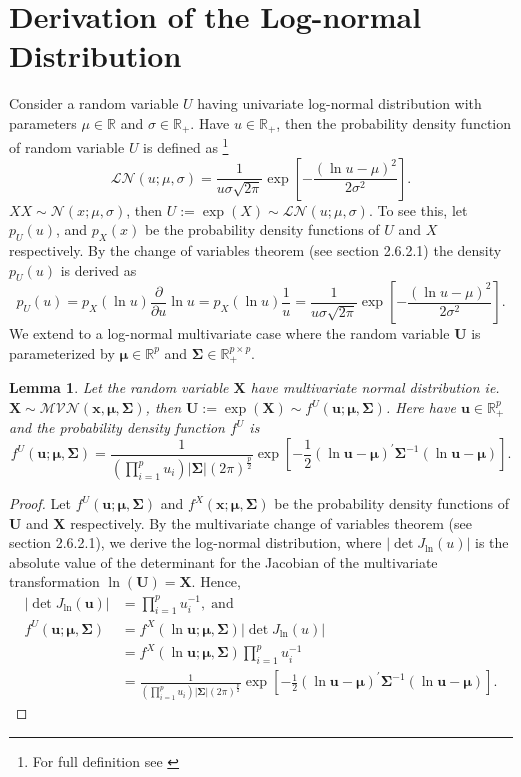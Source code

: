 \documentclass[11pt,letterpaper]{article}
\numberwithin{equation}{section}
\numberwithin{equation}{section}
\numberwithin{equation}{section}
\newtheorem{lemma}[theorem]{Lemma}
\begin{document}
\section{Derivation of the Log-normal Distribution }
Consider a random variable $U$ having univariate log-normal distribution with parameters $\mu \in \mathbb{R}$ and $\sigma \in \mathbb{R}_+ $. Have $u \in \mathbb{R}_+$, then the probability density function of random variable $U$ is defined as \footnote{For full definition see \cite{johnson1995continuous}}
$$\mathcal{LN}(u; \mu, \sigma) = \frac{1}{u\sigma\sqrt{2\pi}}\exp\left[-\frac{(\ln u - \mu)^2}{2\sigma^2}	\right].$$
$X$$ X \sim \mathcal{N}(x; \mu, \sigma) $, then $U := \exp{(X)}\sim \mathcal{LN}(u; \mu, \sigma) $.
To see this, let $p_U(u)$, and $ p_X(x) $ be the probability density functions of $U$ and $X$ respectively. By the change of variables theorem (see \cite{murphy2012machine} section 2.6.2.1) the density $p_U(u)$ is derived as
$$p_U(u) = p_X(\ln u )\frac{\partial}{\partial u} \ln u  =  p_X(\ln u ) \frac{1}{u} =  \frac{1}{u\sigma\sqrt{2\pi}}\exp\left[-\frac{(\ln u - \mu)^2}{2\sigma^2}	\right].$$\newline
 We extend to a log-normal multivariate case where the random variable $\bm{U} $ is parameterized by $ \bm{\mu} \in \mathbb{R}^p$ and $\bm{\Sigma} \in  \mathbb{R}_{+}^{p \times p} \label{changeVarUni} $.
\begin{lemma}
Let the random variable $\bm{X}$ have multivariate normal distribution ie. $\bm{X} \sim \mathcal{MVN}(\bm{x}, \bm{\mu},\bm{\Sigma}) $, then $\bm{U} := \exp(\bm{X} ) \sim  f^U(\bm{u}; \bm{\mu } , \bm{\Sigma} )$. Here
have $\bm{u} \in \mathbb{R}_{+}^p $ and the probability density function $f^U$ is
$$ f^U(\bm{u}; \bm{\mu } , \bm{\Sigma} )= \frac{1}{(\prod_{i=1}^{p}u_{i})| \bm{\Sigma} |(2 \pi)^{\frac{p}{2}}}   \exp\left[-\frac{1}{2}(\ln \bm{u} -\bm{\mu})^{'}  \bm{\Sigma}^{-1}(\ln \bm{u} -\bm{\mu})\right].  $$
\end{lemma}
\begin{proof}
Let $f^U(\bm{u}; \bm{\mu},\bm{\Sigma})$ and $f^X(\bm{x}; \bm{\mu},\bm{\Sigma})$ be the probability density functions of $\bm{U}$ and $\bm{X}$ respectively. By the multivariate change of variables theorem (see \cite{murphy2012machine} section 2.6.2.1), we derive the log-normal distribution, where $ | \det J_{\ln} (u) | $ is the absolute value of the determinant for the Jacobian of the multivariate transformation $\ln(\bm{U}) = \bm{X} $. Hence,
\begin{align*}
 | \det J_{\ln} (\bm{u}) | & = \prod_{i=1}^p u_i^{-1}, \; \text{and} \; \\
   f^U(\bm{u}; \bm{\mu},\bm{\Sigma})  & =  f^X(\ln \bm{u}; \bm{\mu},\bm{\Sigma})  | \det J_{\ln} (u) | \\
  & = f^X(\ln \bm{u}; \bm{\mu},\bm{\Sigma})\prod_{i=1}^p u_i^{-1} \\
  & =  \frac{1}{(\prod_{i=1}^{p}u_{i})| \bm{\Sigma} |(2 \pi)^{\frac{p}{2}}}   \exp\left[-\frac{1}{2}(\ln \bm{u} -\bm{\mu})^{'}  \bm{\Sigma}^{-1}(\ln \bm{u} -\bm{\mu})\right].
  \end{align*}
\end{proof}
\end{document}
